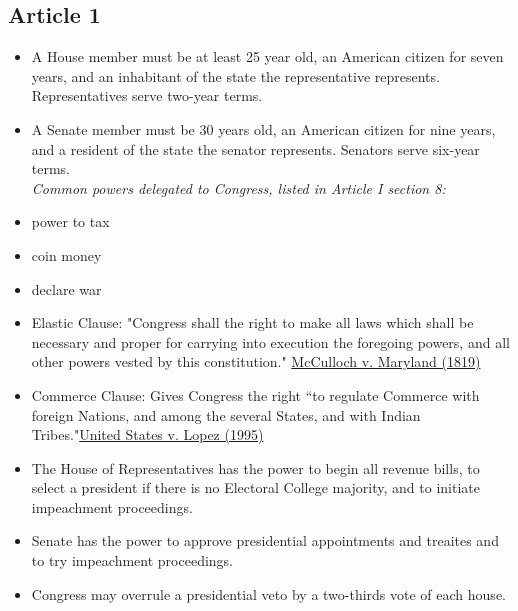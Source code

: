\documentclass[12pt]{article}
\begin{document}
\subsection*{Article 1}
\begin{itemize}
	\item A House member must be at least 25 year old, an American citizen for seven years, and an inhabitant of the state the representative represents. Representatives serve two-year terms.
	\item A Senate member must be 30 years old, an American citizen for nine years, and a resident of the state the senator represents. Senators serve six-year terms.\\

		\textit{Common powers delegated to Congress, listed in Article I section 8:}
	\item power to tax
	\item coin money
	\item declare war
	\item Elastic Clause: "Congress shall the right to make all laws which shall be necessary and proper for carrying into execution the foregoing powers, and all other powers vested by this constitution." \hyperlink{McCulloch}{McCulloch v. Maryland (1819)} 
	\item Commerce Clause: Gives Congress the right ``to regulate Commerce with foreign Nations, and among the several States, and with Indian Tribes."\hyperlink{Lopez}{United States v. Lopez (1995)}
	\item The House of Representatives has the power to begin all revenue bills, to select a president if there is no Electoral College majority, and to initiate impeachment proceedings.
	\item Senate has the power to approve presidential appointments and treaites and to try impeachment proceedings.
	\item Congress may overrule a presidential veto by a two-thirds vote of each house.
\end{itemize}
\end{document}
